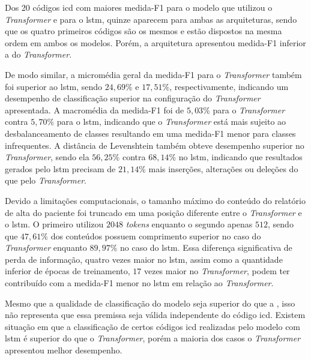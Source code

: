 Dos 20 códigos \gls{icd} com maiores medida-F1 para o modelo que utilizou o \textit{Transformer} e para o \gls{lstm}, quinze aparecem para ambas as arquiteturas, sendo que os quatro primeiros códigos são os mesmos e estão dispostos na mesma ordem em ambos os modelos. Porém, a arquitetura \lstmlstm{} apresentou medida-F1 inferior a do \textit{Transformer}.

De modo similar, a micromédia geral da medida-F1 para o \textit{Transformer} também foi superior ao \gls{lstm}, sendo $24,69\%$ e $17,51\%$, respectivamente, indicando um desempenho de classificação superior na configuração do \textit{Transformer} apresentada. A macromédia da medida-F1 foi de $5,03\%$ para o \textit{Transformer} contra $5,70\%$ para o \gls{lstm}, indicando que o \textit{Transformer} está mais sujeito ao desbalanceamento de classes resultando em uma medida-F1 menor para classes infrequentes. A distância de Levenshtein também obteve desempenho superior no \textit{Transformer}, sendo ela $56,25\%$ contra $68,14\%$ no \gls{lstm}, indicando que resultados gerados pelo \gls{lstm} precisam de $21,14\%$ mais inserções, alterações ou deleções do que pelo \textit{Transformer}.

Devido a limitações computacionais, o tamanho máximo do conteúdo do relatório de alta do paciente foi truncado em uma posição diferente entre o \textit{Transformer} e o \gls{lstm}. O primeiro utilizou $2048$ \textit{tokens} enquanto o segundo apenas $512$, sendo que $47,61\%$ dos conteúdos possuem comprimento superior no caso do \textit{Transformer} enquanto $89,97\%$ no caso do \gls{lstm}. Essa diferença significativa de perda de informação, quatro vezes maior no \gls{lstm}, assim como a quantidade inferior de épocas de treinamento, $17$ vezes maior no \textit{Transformer}, podem ter contribuído com a medida-F1 menor no \gls{lstm} em relação ao \textit{Transformer}.

Mesmo que a qualidade de classificação do modelo \xfmrxfmr{} seja superior do que a \lstmlstm{}, isso não representa que essa premissa seja válida independente do código \gls{icd}. Existem situação em que a classificação de certos códigos \gls{icd} realizadas pelo modelo com \gls{lstm} é superior do que o \textit{Transformer}, porém a maioria dos casos o \textit{Transformer} apresentou melhor desempenho.